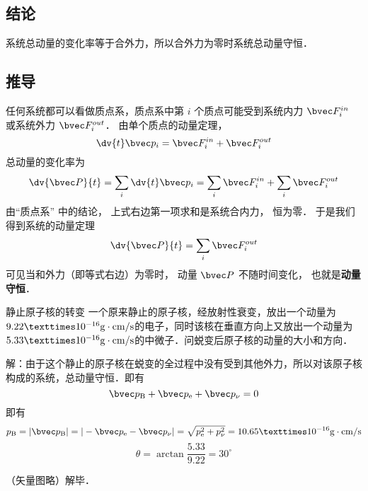 \subsection{结论}
系统总动量的变化率等于合外力，所以合外力为零时系统总动量守恒．

\subsection{推导}
任何系统都可以看做质点系，质点系中第 $i$ 个质点可能受到系统内力 $\bvec F_i^{in}$ 或系统外力 $\bvec F_i^{out}$． 由单个质点的动量定理，
\begin{equation}
\dv{t} \bvec p_i = \bvec F_i^{in} + \bvec F_i^{out}
\end{equation}
总动量的变化率为
\begin{equation}
\dv{\bvec P}{t} = \sum_i \dv{t} \bvec p_i  = \sum_i \bvec F_i^{in}  + \sum_i \bvec F_i^{out}
\end{equation}
由“质点系” 中的结论， 上式右边第一项求和是系统合内力， 恒为零． 于是我们得到系统的动量定理
\begin{equation}
\dv{\bvec P}{t} = \sum_i \bvec F_i^{out}
\end{equation}
可见当和外力（即等式右边）为零时， 动量 $\bvec P$ 不随时间变化， 也就是\textbf{动量守恒}．

\begin{example}{静止原子核的转变}
一个原来静止的原子核，经放射性衰变，放出一个动量为$9.22×10^{-16}{\rm g\cdot cm/s}$的电子，同时该核在垂直方向上又放出一个动量为$5.33×10^{-16}{\rm g\cdot cm/s}$的中微子．问蜕变后原子核的动量的大小和方向．

解：由于这个静止的原子核在蜕变的全过程中没有受到其他外力，所以对该原子核构成的系统，总动量守恒．即有
$$\bvec p_{\rm B}+\bvec p_{\rm e}+\bvec p_{\rm \nu}=0$$
即有
$$p_{\rm B}=|\bvec p_{\rm B}|=|-\bvec p_{\rm e}-\bvec p_{\rm \nu}|=\sqrt{p_{\rm e}^{2}+p_{\rm \nu}^{2}}=10.65×10^{-16}{\rm g\cdot cm/s}$$
$$\theta=\arctan\frac{5.33}{9.22}=30^\circ$$

（矢量图略）解毕．
\end{example}

\usepackage{pgf,tikz,pgfplots}
\pgfplotsset{compat=1.15}
\usepackage{mathrsfs}
\usetikzlibrary{arrows}
\pagestyle{empty}

